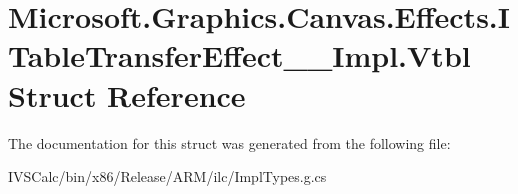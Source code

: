 \hypertarget{struct_microsoft_1_1_graphics_1_1_canvas_1_1_effects_1_1_i_table_transfer_effect_____impl_1_1_vtbl}{}\section{Microsoft.\+Graphics.\+Canvas.\+Effects.\+I\+Table\+Transfer\+Effect\+\_\+\+\_\+\+Impl.\+Vtbl Struct Reference}
\label{struct_microsoft_1_1_graphics_1_1_canvas_1_1_effects_1_1_i_table_transfer_effect_____impl_1_1_vtbl}


The documentation for this struct was generated from the following file\+:\begin{DoxyCompactItemize}
\item 
I\+V\+S\+Calc/bin/x86/\+Release/\+A\+R\+M/ilc/Impl\+Types.\+g.\+cs\end{DoxyCompactItemize}
